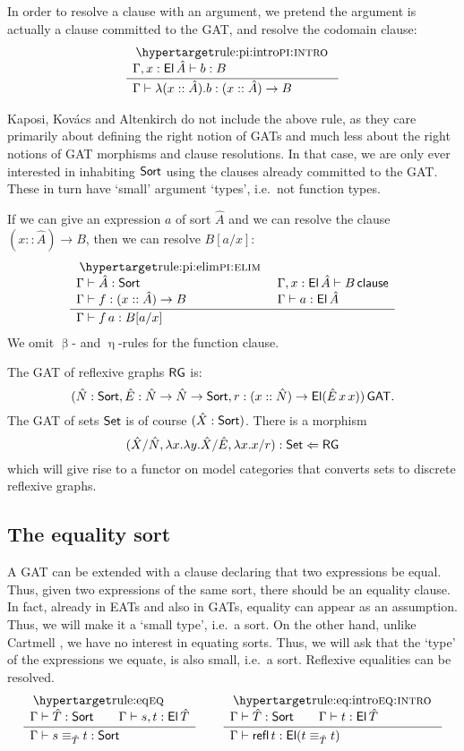 \documentclass[a4paper]{article}
\begin{document}
In order to resolve a clause with an argument, we pretend the argument is actually a clause committed to the GAT, and resolve the codomain clause:
\[
	\inferencel{pi:intro}{
		\Gamma, x : \El\,\hat A \sez b : B
	}{
		\Gamma \sez \lambda(x :: \hat A).b : (x :: \hat A) \to B
	}{}
\]
\begin{remark} \label{rem:kka-no-constructors}
Kaposi, Kov\'acs and Altenkirch \cite{constructing-qiits} do not include the above rule,  as they care primarily about defining the right notion of GATs and much less about the right notions of GAT morphisms and clause resolutions.
In that case, we are only ever interested in inhabiting ${\mathsf{Sort}}$ using the clauses already committed to the GAT. These in turn have `small' argument `types', i.e.\ not function types.
\end{remark}

If we can give an expression $a$ of sort $\hat A$ and we can resolve the clause $(x :: \hat A) \to B$, then we can resolve $B[a/x]$:
\[
	\inferencel{pi:elim}{
		\Gamma \sez \hat A : \Sort &
		\Gamma, x : \El\,\hat A \sez B \clause \\
		\Gamma \sez f : (x :: \hat A) \to B &
		\Gamma \sez a : \El\,\hat A
	}{
		\Gamma \sez f\,a : B[a/x]
	}{}
\]
We omit $\upbeta$- and $\upeta$-rules for the function clause.

\begin{example}
	The GAT of reflexive graphs $\mathsf{RG}$ is:
	\[
		(\hat N : {\mathsf{Sort}}, \hat E : \hat N \to \hat N \to {\mathsf{Sort}}, r : (x :: \hat N) \to {\mathsf{El}}(\hat E\,x\,x)) \,\mathsf{GAT}.
	\]
	The GAT of sets $\mathsf{Set}$ is of course $(\hat X : {\mathsf{Sort}})$.
	There is a morphism
	\[
		(\hat X / \hat N, \lambda x.\lambda y.\hat X / \hat E, \lambda x . x / r) : \mathsf{Set} \Leftarrow \mathsf{RG}
	\]
	which will give rise to a functor on model categories that converts sets to discrete reflexive graphs.
\end{example}

\subsection{The equality sort}
A GAT can be extended with a clause declaring that two expressions be equal.
Thus, given two expressions of the same sort, there should be an equality clause.
In fact, already in EATs and also in GATs, equality can appear as an assumption.
Thus, we will make it a `small type', i.e.\ a sort.
On the other hand, unlike Cartmell \cite{gat,gat-phd}, we have no interest in equating sorts. Thus, we will ask that the `type' of the expressions we equate, is also small, i.e.\ a sort.
Reflexive equalities can be resolved.
\[
	\inferencel{eq}{
		\Gamma \sez \hat T : \Sort \qquad
		\Gamma \sez s, t : \El\,\hat T
	}{
		\Gamma \sez \idtp{\hat T} s t : \Sort
	}{}
	\qquad
	\inferencel{eq:intro}{
		\Gamma \sez \hat T : \Sort \qquad
		\Gamma \sez t : \El\,\hat T
	}{
		\Gamma \sez \refl\,t : \El(\idtp{\hat T} t t)
	}{}
\]
\end{document}
